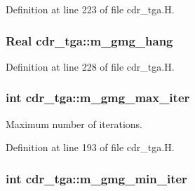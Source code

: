 Definition at line 223 of file cdr\+\_\+tga.\+H.

\subsubsection[{\texorpdfstring{m\+\_\+gmg\+\_\+hang}{m_gmg_hang}}]{\setlength{\rightskip}{0pt plus 5cm}Real cdr\+\_\+tga\+::m\+\_\+gmg\+\_\+hang\hspace{0.3cm}{\ttfamily [protected]}}\hypertarget{classcdr__tga_a0b73cc99ba56c2d60280e1c486a71595}{}\label{classcdr__tga_a0b73cc99ba56c2d60280e1c486a71595}


Definition at line 228 of file cdr\+\_\+tga.\+H.

\subsubsection[{\texorpdfstring{m\+\_\+gmg\+\_\+max\+\_\+iter}{m_gmg_max_iter}}]{\setlength{\rightskip}{0pt plus 5cm}int cdr\+\_\+tga\+::m\+\_\+gmg\+\_\+max\+\_\+iter\hspace{0.3cm}{\ttfamily [protected]}}\hypertarget{classcdr__tga_a70596e82d7ac32db288490d679dbee23}{}\label{classcdr__tga_a70596e82d7ac32db288490d679dbee23}


Maximum number of iterations. 



Definition at line 193 of file cdr\+\_\+tga.\+H.

\subsubsection[{\texorpdfstring{m\+\_\+gmg\+\_\+min\+\_\+iter}{m_gmg_min_iter}}]{\setlength{\rightskip}{0pt plus 5cm}int cdr\+\_\+tga\+::m\+\_\+gmg\+\_\+min\+\_\+iter\hspace{0.3cm}{\ttfamily [protected]}}\hypertarget{classcdr__tga_aa069980aa70a020f7fda891045b2b15e}{}\label{classcdr__tga_aa069980aa70a020f7fda891045b2b15e}


